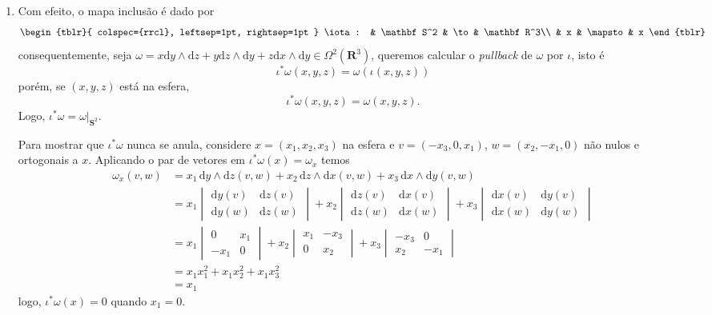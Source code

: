 \documentclass[a4paper, 11pt]{article}
\newcommand{\bR}{\mathbf R}
\newcommand{\bS}{\mathbf S}
\newcommand{\rd}{\mathrm d}
\begin{document}
\begin{enumerate}[leftmargin=*, label=\alph*.]
    \item Com efeito, o mapa inclusão é dado por
    \[
        \begin{tblr}{
            colspec={rrcl}, 
            leftsep=1pt, rightsep=1pt
            }
            \iota: & \bS^2 & \to     & \bR^3\\
                   & x     & \mapsto & x
        \end{tblr}
    \]
    consequentemente, seja $\omega = x \rd y \wedge  \rd z + y \rd z \wedge \rd y + z \rd x \wedge \rd y \in \Omega^2 (\bR^3)$, queremos calcular o \textit{pullback} de $\omega$ por $\iota$, isto é
    \[
        \iota^* \omega (x, y, z) = \omega (\iota (x,y,z))
    \]
    porém, se $(x,y,z)$ está na esfera,
    \[
        \iota^* \omega (x, y, z) = \omega (x,y,z).
    \]
    Logo, $\iota^* \omega = \omega |_{\bS^2}$.

    Para mostrar que $\iota^* \omega$ nunca se anula, considere $x = (x_1, x_2, x_3)$ na esfera e $v = (-x_3, 0, x_1)$, $w = (x_2, -x_1, 0)$ não nulos e ortogonais a $x$.
    Aplicando o par de vetores em $\iota^* \omega (x) = \omega_{x}$ temos
    \begin{align*}
        \omega_x (v, w) &= x_1 \, \rd y \wedge \rd z(v, w) + x_2 \, \rd z \wedge \rd x (v, w) + x_3 \, \rd x \wedge \rd y(v,w)\\
        &= x_1
        \begin{vmatrix}
            \rd y (v) & \rd z (v)\\
            \rd y (w) & \rd z (w)
        \end{vmatrix}
        + x_2
        \begin{vmatrix}
            \rd z (v) & \rd x (v)\\
            \rd z (w) & \rd x (w)
        \end{vmatrix}
        + x_3
        \begin{vmatrix}
            \rd x (v) & \rd y (v)\\
            \rd x (w) & \rd y (w)
        \end{vmatrix}\\
        &= x_1
        \begin{vmatrix}
            0 & x_1\\
            -x_1 & 0
        \end{vmatrix}
        + x_2
        \begin{vmatrix}
            x_1 & -x_3\\
            0 & x_2
        \end{vmatrix}
        + x_3
        \begin{vmatrix}
            -x_3 & 0\\
            x_2 & -x_1
        \end{vmatrix}\\
        &= x_1 x_1^2 + x_1 x_2^2 + x_1 x_3^2\\
        &= x_1
    \end{align*}
    logo, $\iota^* \omega (x) = 0$ quando $x_1 = 0$.


\end{enumerate}
\end{document}
